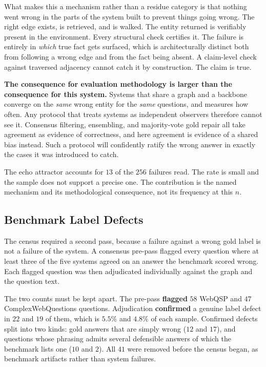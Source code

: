 What makes this a mechanism rather than a residue category is that
nothing went wrong in the parts of the system built to prevent things
going wrong. The right edge exists, is retrieved, and is walked. The
entity returned is verifiably present in the environment. Every
structural check certifies it. The failure is entirely in \emph{which}
true fact gets surfaced, which is architecturally distinct both from
following a wrong edge and from the fact being absent. A claim-level
check against traversed adjacency cannot catch it by construction. The
claim is true.

\textbf{The consequence for evaluation methodology is larger than the
consequence for this system.} Systems that share a graph and a backbone
converge on the \emph{same} wrong entity for the \emph{same} questions,
and  measures how often. Any protocol that treats
systems as independent observers therefore cannot see it. Consensus
filtering, ensembling, and majority-vote gold repair all take agreement
as evidence of correctness, and here agreement is evidence of a shared
bias instead. Such a protocol will confidently ratify the wrong answer
in exactly the cases it was introduced to catch.

The echo attractor accounts for $13$ of the $256$ failures read. The
rate is small and the sample does not support a precise one. The
contribution is the named mechanism and its methodological consequence,
not its frequency at this $n$.

\subsection{Benchmark Label Defects}\label{sec:defects}

The census required a second pass, because a failure against a wrong
gold label is not a failure of the system. A consensus pre-pass flagged
every question where at least three of the five systems agreed on an
answer the benchmark scored wrong. Each flagged question was then
adjudicated individually against the graph and the question text.

The two counts must be kept apart. The pre-pass \textbf{flagged} $58$
WebQSP and $47$ ComplexWebQuestions questions. Adjudication
\textbf{confirmed} a genuine label defect in $22$ and $19$ of them,
which is $5.5\%$ and $4.8\%$ of each sample. Confirmed defects split
into two kinds: gold answers that are simply wrong ($12$ and $17$), and
questions whose phrasing admits several defensible answers of which the
benchmark lists one ($10$ and $2$). All $41$ were removed before the
census began, as benchmark artifacts rather than system failures.


